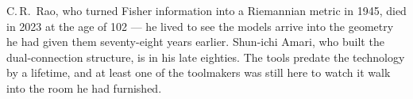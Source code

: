 \documentclass[11pt]{article}
\begin{document}
\begin{summary}
C.\,R.~Rao, who turned Fisher information into a Riemannian metric in 1945, died in 2023 at the
age of 102 --- he lived to see the models arrive into the geometry he had given them
seventy-eight years earlier. Shun-ichi Amari, who built the dual-connection structure, is in his
late eighties. The tools predate the technology by a lifetime, and at least one of the
toolmakers was still here to watch it walk into the room he had furnished.
\end{summary}
\end{document}
